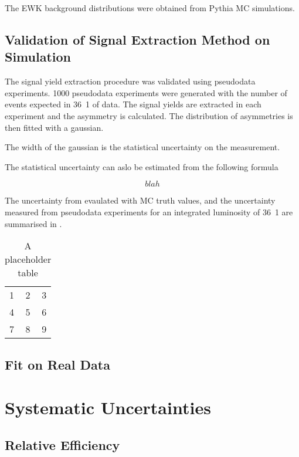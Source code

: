 The \ac{EWK} background \ETm distributions were obtained from Pythia \ac{MC}
simulations.


\subsection{Validation of Signal Extraction Method on Simulation}

The signal yield extraction procedure was validated using pseudodata
experiments. 1000 pseudodata experiments were generated with the number of
events expected in \unit{36.1}{\invpb} of data. The signal yields are extracted
in each experiment and the asymmetry is calculated. The distribution of
asymmetries is then fitted with a gaussian.

The width of the gaussian is the statistical uncertainty on the measurement.

The statistical uncertainty can aslo be estimated from the following formula

\begin{equation}
  blah
  \label{asym36:statuncert}
\end{equation}

The uncertainty from  evaulated with \ac{MC} truth
values, and the uncertainty measured from pseudodata experiments for an
integrated luminosity of \unit{36.1}{\invpb} are summarised in
.

\begin{table}[htb]
  \centering
  \begin{tabular}{| l c r |}
    \hline
    1 & 2 & 3 \\
    4 & 5 & 6 \\
    7 & 8 & 9 \\
  \hline
  \end{tabular}
  \caption{A placeholder table}
  \label{asym36:statuncertsum}
\end{table}

\subsection{Fit on Real Data}

\section{Systematic Uncertainties}
\subsection{Relative Efficiency}

